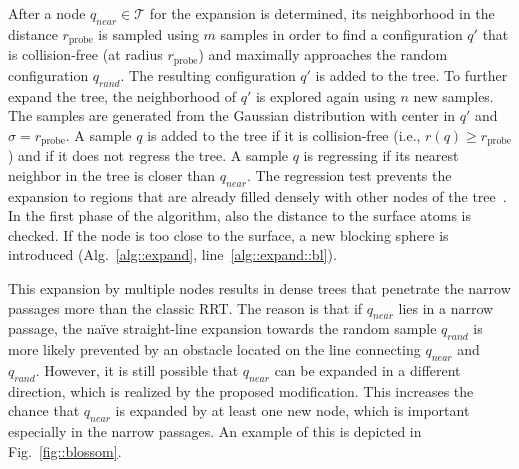 \documentclass[usletter, 10pt, conference]{svjour3}      %
\def\qrand{q_{rand}}
\def\qnear{q_{near}}
\def\T{\mathcal{T}}
\def\probe{r_{\mathrm{probe}}}
\begin{document}
After a node $\qnear \in \T$ for the expansion is determined, its neighborhood in the distance $\probe$ is sampled using $m$ samples in order to find a configuration $q'$ that is collision-free (at radius $\probe$) and maximally approaches the random configuration $\qrand$.
The resulting configuration $q'$ is added to the tree.
To further expand the tree, the neighborhood of $q'$ is explored again using $n$ new samples.
The samples are generated from the Gaussian distribution with center in $q'$ and $\sigma=\probe$.
A sample $q$ is added to the tree if it is collision-free (i.e., $r(q) \ge \probe$) and if it does not regress the tree.
A sample $q$ is regressing if its nearest neighbor in the tree is closer than $\qnear$.
The regression test prevents the expansion to regions that are already filled densely with other nodes of the tree~\cite{kalisiakBlossom}.
In the first phase of the algorithm, also the distance to the surface atoms is checked.
If the node is too close to the surface, a new blocking sphere is introduced (Alg.~\ref{alg::expand}, line~\ref{alg::expand::bl}).

This expansion by multiple nodes results in dense trees that penetrate the narrow passages more than the classic RRT.
The reason is that if $\qnear$ lies in a narrow passage, the na\"{i}ve straight-line expansion towards the random sample $\qrand$ is more likely prevented by an obstacle located on the line connecting $\qnear$ and $\qrand$.
However, it is still possible that $\qnear$ can be expanded in a different direction, which is realized by the proposed modification.
This increases the chance that $\qnear$ is expanded by at least one new node, which is important especially in the narrow passages.
An example of this is depicted in Fig.~\ref{fig::blossom}.
\end{document}
